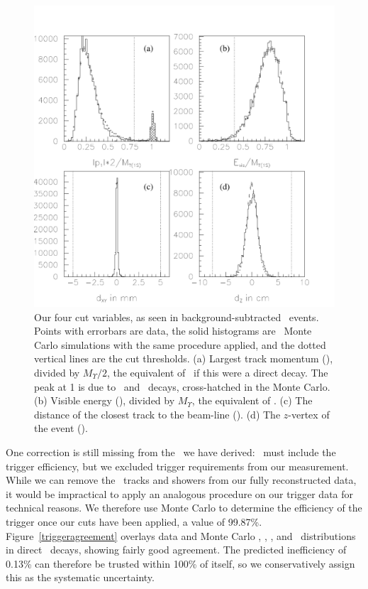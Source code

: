 \documentclass{cornell}
\begin{document}
\begin{figure}[p]
  \begin{center}
    \includegraphics[width=\linewidth]{plots/cascadeagreement}
  \end{center}
  \caption{\label{cascadeagreement} Our four cut variables, as seen in
  background-subtracted \twotoone\ events.  Points with errorbars are
  data, the solid histograms are \twotoone\ Monte Carlo simulations
  with the same procedure applied, and the dotted vertical lines are
  the cut thresholds.  (a) Largest track momentum (\pmax), divided by
  $M_\Upsilon/2$, the equivalent of \ebeam\ if this were a direct
  decay.  The peak at 1 is due to \ee\ and \mumu\ decays,
  cross-hatched in the Monte Carlo.  (b) Visible energy (\visen),
  divided by $M_\Upsilon$, the equivalent of \ecm.  (c) The distance
  of the closest track to the beam-line (\dxy).  (d) The $z$-vertex of
  the event (\dz).}
\end{figure}

One correction is still missing from the \ecuts\ we have derived:
\ecuts\ must include the trigger efficiency, but we excluded trigger
requirements from our measurement.  While we can remove the \pipi\
tracks and showers from our fully reconstructed data, it would be
impractical to apply an analogous procedure on our trigger data for
technical reasons.  We therefore use Monte Carlo to determine the
efficiency of the trigger once our cuts have been applied, a value of
99.87\%.  Figure~\ref{triggeragreement} overlays data and Monte Carlo
\axial, \stereo, \cblo, and \cbmd\ distributions in direct \us\
decays, showing fairly good agreement.  The predicted inefficiency of
0.13\% can therefore be trusted within 100\% of itself, so we
conservatively assign this as the systematic uncertainty.
\end{document}

